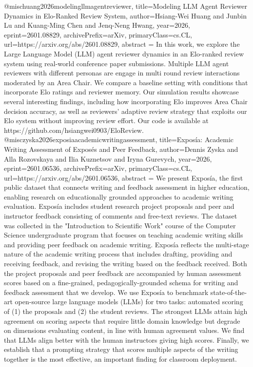 {}@misc{huang2026modelingllmagentreviewer,
      title={Modeling LLM Agent Reviewer Dynamics in Elo-Ranked Review System}, 
      author={Hsiang-Wei Huang and Junbin Lu and Kuang-Ming Chen and Jenq-Neng Hwang},
      year={2026},
      eprint={2601.08829},
      archivePrefix={arXiv},
      primaryClass={cs.CL},
      url={https://arxiv.org/abs/2601.08829},
      abstract = {In this work, we explore the Large Language Model (LLM) agent reviewer dynamics in an Elo-ranked review system using real-world conference paper submissions. Multiple LLM agent reviewers with different personas are engage in multi round review interactions moderated by an Area Chair. We compare a baseline setting with conditions that incorporate Elo ratings and reviewer memory. Our simulation results showcase several interesting findings, including how incorporating Elo improves Area Chair decision accuracy, as well as reviewers' adaptive review strategy that exploits our Elo system without improving review effort. Our code is available at https://github.com/hsiangwei0903/EloReview.}
}@misc{zyska2026exposiaacademicwritingassessment,
      title={Expos\'ia: Academic Writing Assessment of Expos\'es and Peer Feedback}, 
      author={Dennis Zyska and Alla Rozovskaya and Ilia Kuznetsov and Iryna Gurevych},
      year={2026},
      eprint={2601.06536},
      archivePrefix={arXiv},
      primaryClass={cs.CL},
      url={https://arxiv.org/abs/2601.06536},
      abstract = {We present Exposía, the first public dataset that connects writing and feedback assessment in higher education, enabling research on educationally grounded approaches to academic writing evaluation. Exposía includes student research project proposals and peer and instructor feedback consisting of comments and free-text reviews. The dataset was collected in the "Introduction to Scientific Work" course of the Computer Science undergraduate program that focuses on teaching academic writing skills and providing peer feedback on academic writing. Exposía reflects the multi-stage nature of the academic writing process that includes drafting, providing and receiving feedback, and revising the writing based on the feedback received. Both the project proposals and peer feedback are accompanied by human assessment scores based on a fine-grained, pedagogically-grounded schema for writing and feedback assessment that we develop.   We use Exposía to benchmark state-of-the-art open-source large language models (LLMs) for two tasks: automated scoring of (1) the proposals and (2) the student reviews. The strongest LLMs attain high agreement on scoring aspects that require little domain knowledge but degrade on dimensions evaluating content, in line with human agreement values. We find that LLMs align better with the human instructors giving high scores. Finally, we establish that a prompting strategy that scores multiple aspects of the writing together is the most effective, an important finding for classroom deployment.}
}

